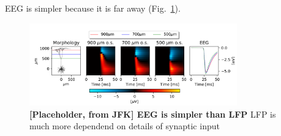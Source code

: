 \section{}
EEG is simpler because it is far away (Fig.~\ref{EEG:fig:simple_EEG}).
\begin{figure}[!ht]
\begin{center}
\includegraphics[width=0.8\textwidth]{Figures/EEG/EEG_is_simple.png}
\end{center}
\caption{\textbf{[Placeholder, from JFK] EEG is simpler than LFP} 
LFP is much more dependend on details of synaptic input
}
\label{EEG:fig:simple_EEG}
\end{figure}



\section{ }
